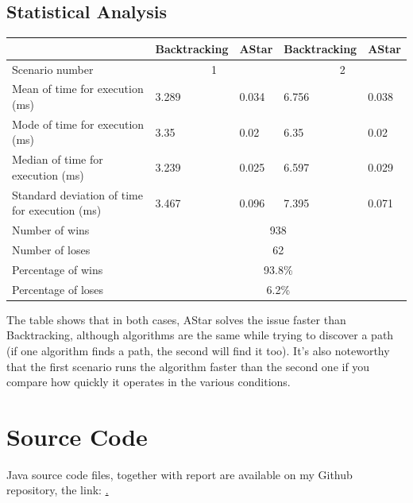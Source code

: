 \documentclass[a4paper,12pt]{article}
\begin{document}
\subsection{Statistical Analysis}
\begin{center}
\begin{tabular}{ |p{5cm}|p{2.5cm}|p{2.5cm}|p{2.5cm}|p{2.5cm}| }
    \hline
    & Backtracking&AStar&Backtracking&AStar\\
    \hline
    Scenario number&\multicolumn{2}{|c|}{1} & \multicolumn{2}{|c|}{2}\\
    \hline
    Mean of time for execution (ms) & 3.289 & 0.034 & 6.756 & 0.038\\
    Mode of time for execution (ms) & 3.35  & 0.02 &6.35& 0.02\\
    Median of time for execution (ms)& 3.239 & 0.025 &6.597& 0.029\\
    Standard deviation of time for execution (ms) & 3.467 & 0.096 &7.395& 0.071\\
    \hline
    Number of wins & \multicolumn{4}{|c|}{938} \\
    Number of loses & \multicolumn{4}{|c|}{62}  \\
    Percentage of wins & \multicolumn{4}{|c|}{93.8\%} \\
    Percentage of loses & \multicolumn{4}{|c|}{6.2\%} \\
    \hline
\end{tabular}
\end{center}
The table shows that in both cases, AStar solves the issue faster than Backtracking, although algorithms are the same while trying to discover a path (if one algorithm finds a path, the second will find it too). 
It's also noteworthy that the first scenario runs the algorithm faster than the second one if you compare how quickly it operates in the various conditions.
\section{Source Code}
Java source code files, together with report are available
on my Github repository, the link: \href{https://github.com/akmchnkv/Compass-and-Pirates}.\\
\end{document}
